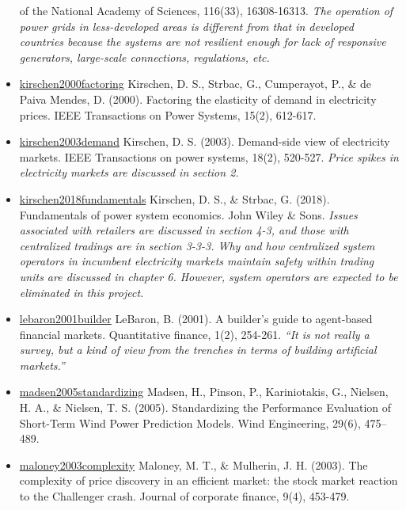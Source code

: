 \documentclass[letterpaper,8pt,twocolumn,twoside,]{pinp}
\begin{document}
\begin{itemize}
  of the National Academy of Sciences, 116(33), 16308-16313. \emph{The
  operation of power grids in less-developed areas is different from
  that in developed countries because the systems are not resilient
  enough for lack of responsive generators, large-scale connections,
  regulations, etc.}
\item
  \href{https://ieeexplore.ieee.org/document/867149}{kirschen2000factoring}
  Kirschen, D. S., Strbac, G., Cumperayot, P., \& de Paiva Mendes, D.
  (2000). Factoring the elasticity of demand in electricity prices. IEEE
  Transactions on Power Systems, 15(2), 612-617.
\item
  \href{https://ieeexplore.ieee.org/document/1198281}{kirschen2003demand}
  Kirschen, D. S. (2003). Demand-side view of electricity markets. IEEE
  Transactions on power systems, 18(2), 520-527. \emph{Price spikes in
  electricity markets are discussed in section 2.}
\item
  \href{https://www.wiley.com/en-us/Fundamentals+of+Power+System+Economics\%2C+2nd+Edition-p-9781119213253}{kirschen2018fundamentals}
  Kirschen, D. S., \& Strbac, G. (2018). Fundamentals of power system
  economics. John Wiley \& Sons. \emph{Issues associated with retailers
  are discussed in section 4-3, and those with centralized tradings are
  in section 3-3-3. Why and how centralized system operators in
  incumbent electricity markets maintain safety within trading units are
  discussed in chapter 6. However, system operators are expected to be
  eliminated in this project.}
\item
  \href{https://www.tandfonline.com/doi/abs/10.1088/1469-7688/1/2/307}{lebaron2001builder}
  LeBaron, B. (2001). A builder's guide to agent-based financial
  markets. Quantitative finance, 1(2), 254-261. \emph{``It is not really
  a survey, but a kind of view from the trenches in terms of building
  artificial markets.''}
\item
  \href{https://journals.sagepub.com/doi/abs/10.1260/030952405776234599}{madsen2005standardizing}
  Madsen, H., Pinson, P., Kariniotakis, G., Nielsen, H. A., \& Nielsen,
  T. S. (2005). Standardizing the Performance Evaluation of Short-Term
  Wind Power Prediction Models. Wind Engineering, 29(6), 475--489.
\item
  \href{https://www.sciencedirect.com/science/article/pii/S092911990200055X}{maloney2003complexity}
  Maloney, M. T., \& Mulherin, J. H. (2003). The complexity of price
  discovery in an efficient market: the stock market reaction to the
  Challenger crash. Journal of corporate finance, 9(4), 453-479.

\end{itemize}
\end{document}
